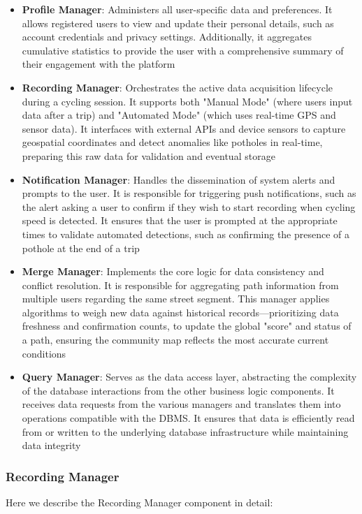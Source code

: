 \begin{itemize}
	identifying the "best" path as defined by the community data
	\item \textbf{Profile Manager}: Administers all user-specific data and preferences. It allows registered users to view and update their personal details, 
	such as account credentials and privacy settings. Additionally, it aggregates cumulative statistics to provide the user with a comprehensive summary of their engagement with the platform
	\item \textbf{Recording Manager}: Orchestrates the active data acquisition lifecycle during a cycling session. It supports both "Manual Mode" (where users input data after a trip) and "Automated Mode" (which uses real-time GPS and sensor data). 
	It interfaces with external APIs and device sensors to capture geospatial coordinates and detect anomalies like potholes in real-time, preparing this raw data for validation and eventual storage
	\item \textbf{Notification Manager}: Handles the dissemination of system alerts and prompts to the user. It is responsible for triggering push notifications, such as the alert asking a user to confirm if they wish to start recording when cycling speed is detected. 
	It ensures that the user is prompted at the appropriate times to validate automated detections, such as confirming the presence of a pothole at the end of a trip
	\item \textbf{Merge Manager}: Implements the core logic for data consistency and conflict resolution. It is responsible for aggregating path information from multiple users regarding the same street segment. 
	This manager applies algorithms to weigh new data against historical records—prioritizing data freshness and confirmation counts, to update the global "score" and status of a path, ensuring the community map reflects the most accurate current conditions
	\item \textbf{Query Manager}: Serves as the data access layer, abstracting the complexity of the database interactions from the other business logic components. 
	It receives data requests from the various managers and translates them into operations compatible with the DBMS. It ensures that data is efficiently read from or written to 
	the underlying database infrastructure while maintaining data integrity
\end{itemize}

\subsubsection*{Recording Manager}
Here we describe the Recording Manager component in detail:


